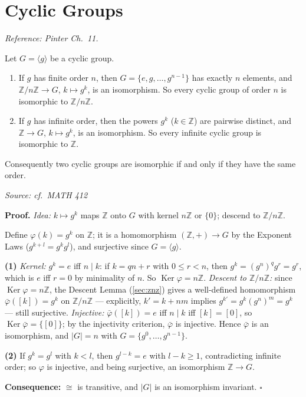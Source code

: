 \documentclass[11pt]{report}
\renewenvironment{proof}[1][Proof]{\noindent\textbf{#1.} }{\hfill$\square$\par\vspace{5pt}}
\newcommand{\srcline}[1]{\par\hfill{\footnotesize\textit{Source: #1}}}
\begin{document}
\section{Cyclic Groups}\label{sec:cyclic}

\textit{Reference: Pinter Ch.\ 11.}

\begin{thmbox}\label{thm:classification-cyclic-groups}
Let $G = \langle g \rangle$ be a cyclic group.
\begin{enumerate}
    \item If $g$ has finite order $n$, then $G = \{e, g, \ldots, g^{n-1}\}$ has exactly $n$ elements, and $\mathbb{Z}/n\mathbb{Z} \to G$, $k \mapsto g^k$, is an isomorphism. So every cyclic group of order $n$ is isomorphic to $\mathbb{Z}/n\mathbb{Z}$.
    \item If $g$ has infinite order, then the powers $g^k$ ($k \in \mathbb{Z}$) are pairwise distinct, and $\mathbb{Z} \to G$, $k \mapsto g^k$, is an isomorphism. So every infinite cyclic group is isomorphic to $\mathbb{Z}$.
\end{enumerate}
Consequently two cyclic groups are isomorphic if and only if they have the same order.
\srcline{cf.\ MATH 412}
\end{thmbox}

\begin{proof}
\textit{Idea:} $k \mapsto g^k$ maps $\mathbb{Z}$ onto $G$ with kernel $n\mathbb{Z}$ or $\{0\}$; descend to $\mathbb{Z}/n\mathbb{Z}$.\par
Define $\varphi(k) = g^k$ on $\mathbb{Z}$; it is a homomorphism $(\mathbb{Z}, +) \to G$ by the Exponent Laws ($g^{k+l} = g^k g^l$), and surjective since $G = \langle g \rangle$.

\textbf{(1)} \emph{Kernel:} $g^k = e$ iff $n \mid k$: if $k = qn + r$ with $0 \leq r < n$, then $g^k = (g^n)^q g^r = g^r$, which is $e$ iff $r = 0$ by minimality of $n$. So $\operatorname{Ker}\varphi = n\mathbb{Z}$. \emph{Descent to $\mathbb{Z}/n\mathbb{Z}$:} since $\operatorname{Ker}\varphi = n\mathbb{Z}$, the Descent Lemma (\ref{sec:znz}) gives a well-defined homomorphism $\bar\varphi([k]) = g^k$ on $\mathbb{Z}/n\mathbb{Z}$ --- explicitly, $k' = k + nm$ implies $g^{k'} = g^k (g^n)^m = g^k$ --- still surjective. \emph{Injective:} $\bar\varphi([k]) = e$ iff $n \mid k$ iff $[k] = [0]$, so $\operatorname{Ker}\bar\varphi = \{[0]\}$; by the injectivity criterion, $\bar\varphi$ is injective. Hence $\bar\varphi$ is an isomorphism, and $|G| = n$ with $G = \{g^0, \ldots, g^{n-1}\}$.

\textbf{(2)} If $g^k = g^l$ with $k < l$, then $g^{l-k} = e$ with $l - k \geq 1$, contradicting infinite order; so $\varphi$ is injective, and being surjective, an isomorphism $\mathbb{Z} \to G$.

\textbf{Consequence:} $\cong$ is transitive, and $|G|$ is an isomorphism invariant.
\end{proof}
\end{document}
